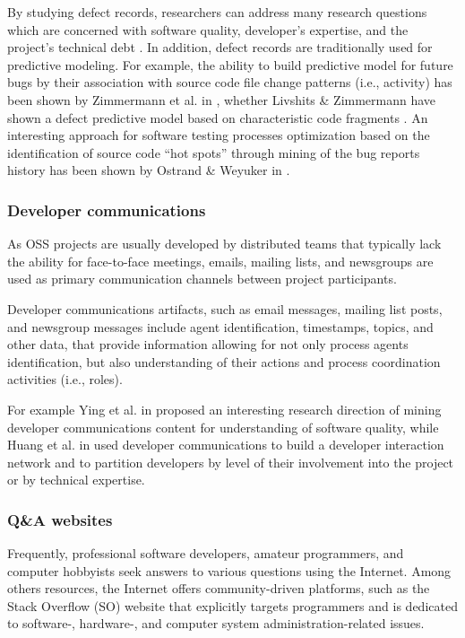 By studying defect records, researchers can address many research questions which are concerned with software quality,
developer's expertise, and the project's technical debt \cite{citeulike:12550438}. 
In addition, defect records are traditionally used for predictive modeling.
For example, the ability to build predictive model for future bugs by their association with source code file change patterns 
(i.e., activity) has been shown by Zimmermann et al. in \cite{citeulike:6055293}, whether Livshits \& Zimmermann 
have shown a defect predictive model based on characteristic code fragments \cite{citeulike:393158}. 
An interesting approach for software testing processes optimization based on the identification of source code 
``hot spots'' through mining of the bug reports history has been shown by Ostrand \& Weyuker in \cite{ostrand2004tool}.

\subsubsection{Developer communications}
As OSS projects are usually developed by distributed teams that typically lack the ability for face-to-face meetings, 
emails, mailing lists, and newsgroups are used as primary communication channels between project participants. 

Developer communications artifacts, such as email messages, mailing list posts, and newsgroup messages include 
agent identification, timestamps, topics, and other data, that provide information allowing for not only process agents 
identification, but also understanding of their actions and process coordination activities (i.e., roles). 


For example Ying et al. in \cite{citeulike:1366052} proposed an interesting research direction of mining developer 
communications content for understanding of software quality, while Huang et al. in \cite{citeulike:9495129} used developer 
communications to build a developer interaction network and to partition developers by level of their involvement into the 
project or by technical expertise.

\subsubsection{Q\&A websites}
Frequently, professional software developers, amateur programmers, and computer hobbyists seek answers to various questions 
using the Internet. 
Among others resources, the Internet offers com\-munity-driven platforms, such as the Stack Overflow (SO) website that explicitly 
targets programmers and is dedicated to software-, hardware-, and computer system administration-related issues.

